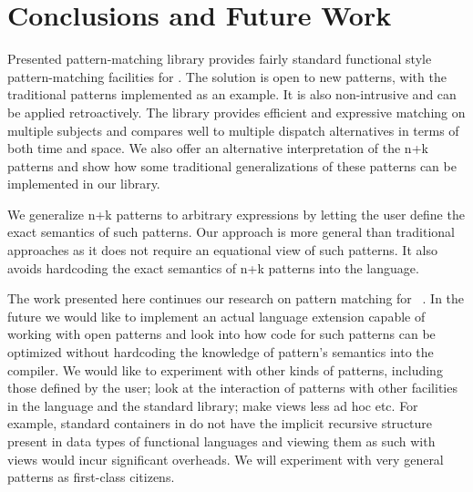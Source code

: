 \section{Conclusions and Future Work} %
\label{sec:cc}

Presented pattern-matching library provides fairly standard functional style 
pattern-matching facilities for \Cpp{}. The solution is open to new patterns, 
with the traditional patterns implemented as an example. It is also 
non-intrusive and can be applied retroactively. %
The library provides efficient and expressive matching on multiple subjects and 
compares well to multiple dispatch alternatives in terms of both time and space.
We also offer an alternative interpretation of the n+k patterns and show how some 
traditional generalizations of these patterns can be implemented in our library. 

We generalize n+k patterns to arbitrary expressions by letting the user define 
the exact semantics of such patterns. Our approach is more general than traditional approaches 
as it does not require an
equational view of such patterns. It also avoids hardcoding the 
exact semantics of n+k patterns into the language. 


The work presented here continues our research on pattern matching for 
\Cpp{}~\cite{TS12}. In the future we would like to implement an actual language 
extension capable of working with open patterns and look into how code for such 
patterns can be optimized without hardcoding the knowledge of pattern's 
semantics into the compiler. 
We would like to experiment with other kinds of patterns, 
including those defined by the user; look at the interaction of patterns with 
other facilities in the language and the standard library; make
views less ad hoc etc. For example, standard containers in \Cpp{} do not have the 
implicit recursive structure present in data types of functional languages and 
viewing them as such with views would incur significant overheads. We will
experiment with very general patterns as first-class citizens.

